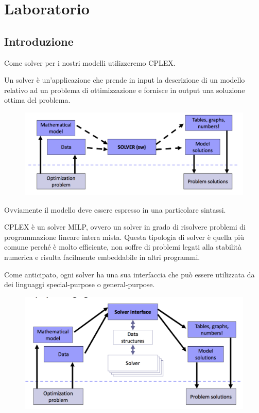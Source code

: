
\chapter{Laboratorio}

\section{Introduzione}

Come solver per i nostri modelli utilizzeremo CPLEX.

Un solver è un'applicazione che prende in input la descrizione di un modello relativo ad un problema di ottimizzazione e fornisce in output una soluzione ottima del problema.

\begin{figure}[htbp]
	\centering
	\includegraphics[width=0.7\linewidth]{./images/lab1-schema-1}
\end{figure}

Ovviamente il modello deve essere espresso in una particolare sintassi.

CPLEX è un solver MILP, ovvero un solver in grado di risolvere problemi di programmazione lineare intera mista.
Questa tipologia di solver è quella più comune perché è molto efficiente, non soffre di problemi legati alla stabilità numerica e risulta facilmente embeddabile in altri programmi.

Come anticipato, ogni solver ha una sua interfaccia che può essere utilizzata da dei linguaggi special-purpose o general-purpose.

\begin{figure}[htbp]
	\centering
	\includegraphics[width=0.7\linewidth]{./images/lab1-schema-2}
\end{figure}

